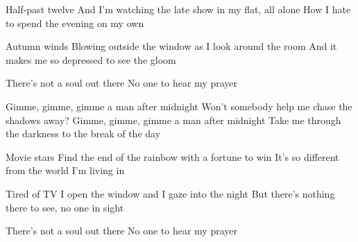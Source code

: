 \begin{verse*}
Half-past twelve
And I'm watching the late show
in my flat, all alone
How I hate to spend the evening on my own
\end{verse*}

\begin{verse*}
Autumn winds
Blowing outside the window
as I look around the room
And it makes me so depressed to see the gloom
\end{verse*}

\begin{verse*}
There's not a soul out there
No one to hear my prayer
\end{verse*}

\begin{chorus}
Gimme, gimme, gimme a man after midnight
Won't somebody help me chase the shadows away?
Gimme, gimme, gimme a man after midnight
Take me through the darkness to the break of the day
\end{chorus}

\begin{verse*}
Movie stars
Find the end of the rainbow
with a fortune to win
It's so different from the world I'm living in
\end{verse*}

\begin{verse*}
Tired of TV
I open the window
and I gaze into the night
But there's nothing there to see, no one in sight
\end{verse*}

\begin{verse*}
There's not a soul out there
No one to hear my prayer
\end{verse*}

\thechorus[2]